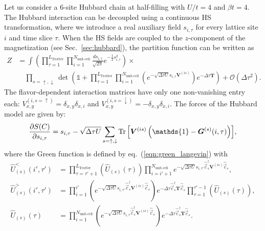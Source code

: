 Let us consider a 6-site Hubbard chain at half-filling with $U/t = 4$ and  $\beta t = 4$.
The Hubbard interaction can be decoupled using a continuous HS transformation, where we introduce a real auxiliary field $s_{i,\tau}$ for every lattice site $i$ and time slice $\tau$. When the HS fields are coupled to the $z$-component of the magnetization (see Sec.~\ref{sec:hubbard}), the partition function can be written as
\begin{align}
Z &= \int \left( \prod_{\tau=1}^{L_{\text{Trotter}}} \prod_{i=1}^{N_{\text{unit-cell}} } \frac{d s_{i,\tau}}{\sqrt{2 \pi}} e^{-\frac{1}{2} s_{i,\tau}^2 } \right) \times \nonumber \\
 &\quad \prod_{s=\uparrow, \downarrow} \det \left(  \mathds{1} + \prod_{\tau=1}^{L_{\mathrm{Trotter}}}    \prod_{i=1}^{N_{\text{unit-cell}}} \left( e^{-\sqrt{\Delta \tau U}s_{i,\tau} \bm{V}^{(is)}} \right) e^{-\Delta \tau \bm{T}} \right) + \mathcal{O}(\Delta\tau^{2}).
\end{align}
The flavor-dependent interaction matrices have only one non-vanishing entry each: $V_{x,y}^{(i,s=\uparrow)}=\delta_{x,y}\delta_{x,i}$ and $V_{x,y}^{(i,s=\downarrow)}=-\delta_{x,y}\delta_{x,i}$. 
The forces of the Hubbard model are given by:
\begin{equation}
\frac { \partial S(C)}{\partial s_{i,\tau} } = s_{i,\tau} - \sqrt{\Delta \tau U} \sum\limits_{s=\uparrow, \downarrow} \Tr{\left[ \bm{V}^{(is)}\left(\mathds{1} - \bm{G}^{(s)}(i,\tau) \right) \right]} ,
\end{equation}
where the Green function is defined by eq.~(\ref{eqn:green_langevin}) with
\begin{align}
 \hat{U}_{(s)}^{<}(i',\tau') &= \prod_{\tau=\tau'+1}^{L_{\text{Trotter}}}  \left( \hat{U}_{(s)}(\tau) \right)
\prod_{i=i'+1}^{N_{\text{unit-cell}} } e^{-\sqrt{\Delta\tau U}  s_{i,\tau'} \hat{\vec{c}}_{s}^{\dagger} \bm{V}^{(is)} \hat{\vec{c}}_{s}^{\phantom\dagger}}, \\
 \hat{U}_{(s)}^{>}(i',\tau') &= \prod_{i=1}^{i'}\left( e^{-\sqrt{\Delta\tau U}  s_{i,\tau'} \hat{\vec{c}}_{s}^{\dagger} \bm{V}^{(is)} \hat{\vec{c}}_{s}^{\phantom\dagger}} \right)
    e^{-\Delta\tau  \hat{\vec{c}}_{s}^{\dagger} \bm{T} \hat{\vec{c}}_{s}^{\phantom\dagger}} 
  \prod_{\tau=1}^{\tau'-1}  \left( \hat{U}_{(s)}(\tau) \right), \\
  \hat{U}_{(s)}(\tau) &=  \prod_{i=1}^{N_{\text{unit-cell}} } \left(e^{-\sqrt{\Delta\tau U}  s_{i,\tau} \hat{\vec{c}}_{s}^{\dagger} \bm{V}^{(is)} \hat{\vec{c}}_{s}^{\phantom\dagger}} \right)
   e^{-\Delta\tau  \hat{\vec{c}}_{s}^{\dagger} \bm{T} \hat{\vec{c}}_{s}^{\phantom\dagger}} .
\end{align}
